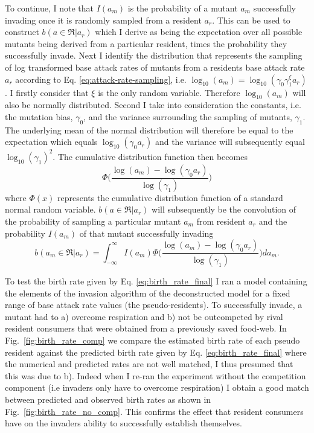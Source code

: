 \documentclass[a4paper]{report}
\DeclareMathOperator{\log}{log}
\begin{document}
{To continue, I note that $I(a_{m})$ is the probability of a mutant $a_{m}$ successfully invading once it is randomly
sampled from a resident $a_{r}$. This  can be used to construct $b(a\in\Re|a_{r})$ which I derive as being the expectation over all possible mutants being derived from a particular resident, times the probability they successfully invade. Next I identify the distribution that represents the sampling of log transformed base attack rates of mutants from a residents base attack rate $a_r$ according to Eq. \eqref{eq:attack-rate-sampling}, i.e. $\log_{10}(a_m)=\log_{10}(\gamma_0\gamma_1^{\xi}a_r)$. I firstly consider that $\xi$ is the only random variable. Therefore $\log_{10}(a_m)$ will also be normally distributed. Second I take into consideration the constants, i.e. the mutation bias, $\gamma_0$, and the variance surrounding the sampling of mutants, $\gamma_1$. The underlying mean of the normal distribution will therefore be equal to the expectation which equals $\log_{10}(\gamma_0a_r)$ and the variance will subsequently equal $\log_{10}(\gamma_1)^2$. The cumulative distribution function then becomes
\begin{equation}
\Phi\Big(\frac{\log(a_m)-\log(\gamma_0a_r)}{\log(\gamma_1)}\Big) \label{eq:mutant_prob}
\end{equation}
where $\Phi(x)$ represents the cumulative distribution function of a standard normal random variable. $b(a\in\Re|a_{r})$ will subsequently be the convolution of the probability of sampling a particular mutant $a_m$ from resident $a_r$ and the probability $I(a_{m})$ of that mutant successfully invading
\begin{equation}
b(a_{m}\in\Re|a_{r})=\int_{-\infty}^{\infty}I(a_m)\Phi\Big(\frac{\log(a_m)-\log(\gamma_0a_r)}{\log(\gamma_1)}\Big)da_m. \label{eq:birth_rate_final}
\end{equation}

To test the birth rate given by Eq. \eqref{eq:birth_rate_final} I ran a model containing the elements of the invasion algorithm of the deconstructed model for a fixed range of base attack rate values (the pseudo-residents). To successfully invade, a mutant had to a) overcome respiration and b) not be outcompeted by rival resident consumers that were obtained from a previously saved food-web. In Fig.~\ref{fig:birth_rate_comp} we compare the estimated birth rate of each pseudo resident against the predicted birth rate given by Eq. \eqref{eq:birth_rate_final} where the numerical and predicted rates are not well matched, I thus presumed that this was due to b). Indeed when I re-ran the experiment without the competition component (i.e invaders only have to overcome respiration) I obtain a good match between predicted and observed birth rates as shown in Fig.~\ref{fig:birth_rate_no_comp}. This confirms the effect that resident consumers have on the invaders ability to successfully establish themselves. \\

}
\end{document}
